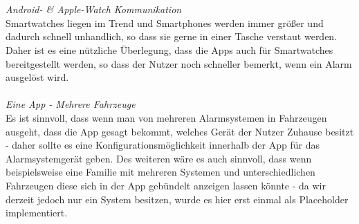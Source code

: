 \\
\\
\textit{Android- \& Apple-Watch Kommunikation}
\\
Smartwatches liegen im Trend und Smartphones werden immer größer und dadurch schnell unhandlich, so dass sie gerne in einer Tasche verstaut werden. Daher ist es eine nützliche Überlegung, dass die Apps auch für Smartwatches bereitgestellt werden, so dass der Nutzer noch schneller bemerkt, wenn ein Alarm ausgelöst wird.
\\
\\
\textit{Eine App - Mehrere Fahrzeuge}
\\
Es ist sinnvoll, dass wenn man von mehreren Alarmsystemen in Fahrzeugen ausgeht, dass die App gesagt bekommt, welches Gerät der Nutzer Zuhause besitzt - daher sollte es eine Konfigurationsmöglichkeit innerhalb der App für das Alarmsystemgerät geben. Des weiteren wäre es auch sinnvoll, dass wenn beispielsweise eine Familie mit mehreren Systemen und unterschiedlichen Fahrzeugen diese sich in der App  gebündelt anzeigen lassen könnte - da wir derzeit jedoch nur ein System besitzen, wurde es hier erst einmal als Placeholder implementiert.
